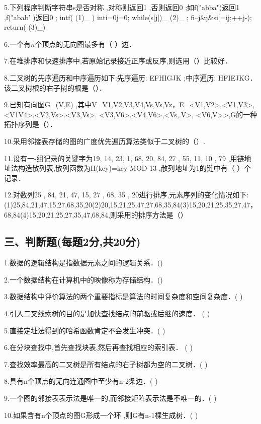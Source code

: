 5.下列程序判断字符串s是否对称 ,对称则返回1 ,否则返回0 ;如f("abba")返回1 ,f("abab' )返回0 ;
intf( (1)_ )
inti=0j=0;
while(s[j])_ (2)_ ;
fi--j&j&si[=ij;++j-);
return( (3)_)

6.一个有$n$个顶点的无向图最多有（  ）边．

7.在堆排序和快速排序中,若原始记录接近正序或反序,则选用（）比较好．

8.二叉树的先序遍历和中序遍历如下:先序遍历: EFHIGJK ;中序遍历: HFIEJKG． 该二叉树根的右子树的根是（）．

9.已知有向图G=(V,E) ,其中V={V1,V2,V3,V4,Vs,Vs,Vz}，E={<V1,V2>,<V1,V3>,<V1V4>.<V2,Vs>.<V3,Vs>. <V3,V6>.<V4,V6>,<Vs,.V>, <V6,V>>},G的一种拓扑序列是（）．

10.采用邻接表存储的图的广度优先遍历算法类似于二叉树的（）.

11.设有一-组记录的关键字为{19, 14, 23, 1, 68, 20, 84, 27 , 55, 11, 10 , 79} ,用链地址法构造散列表,散列函数为H(key)=key MOD 13 ,散列地址为1的链中有（  ）个记录．

12.对数列{25 , 84, 21, 47, 15, 27 , 68, 35 , 20}进行排序,元素序列的变化情况如下:
(1)25,84,21,47,15,27,68,35,20(2)20,15,21,25,47,27,68,35,84(3)15,20,21,25,35,27,47，68,84(4)15,20,21,25,27,35,47,68,84,则采用的排序方法是（）

\subsection{三、判断题(每题2分,共20分)}
1.数据的逻辑结构是指数据元素之间的逻辑关系．()

2.一个数据结构在计算机中的映像称为存储结构．()

3.数据结构中评价算法的两个重要指标是算法的时间复杂度和空间复杂度．( )

4.引入二叉线索树的目的是加快查找结点的前驱或后继的速度． ( )

5.直接定址法得到的哈希函数肯定不会发生冲突．( )

6.在分块查找中,首先查找块表,然后再查找相应的索引表． ( )

7.查找效率最高的二又树是所有结点的右子树都为空的二叉树．( )

8.具有n个顶点的无向连通图中至少有n-2条边．( )

9.一个图的邻接表表示法是唯一的,而邻接矩阵表示法是不唯一的．( )

10.如果含有n个顶点的图G形成一个环 ,则G有n-1棵生成树．( )